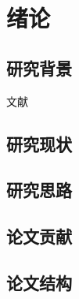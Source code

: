\chapter{绪论}
\label{cha:intro}

\section{研究背景}
文献~\cite{DBLP:conf/csl/LiuJO15,DBLP:conf/birthday/LiuJ14,DBLP:conf/rta/LiuDJ14,DBLP:journals/tcs/JouannaudL12,tie/Liu} 



\section{研究现状}

\section{研究思路}


\section{论文贡献}
\label{sec:theorem}

\section{论文结构}
\label{sec:bib}
